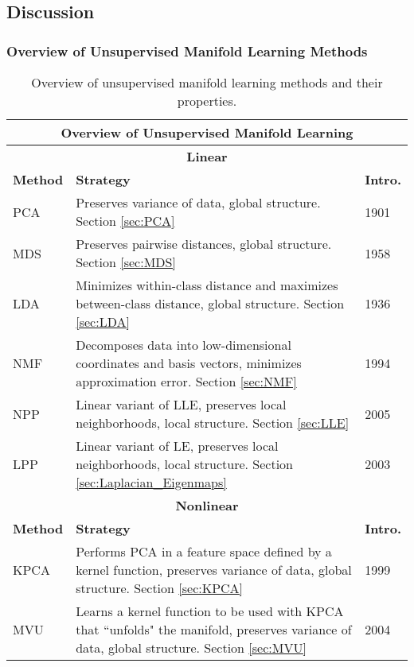 \subsection{Discussion}

\subsubsection{Overview of Unsupervised Manifold Learning Methods}

\begin{longtable}{ |p{}|p{}|p{}| } 
	\caption{Overview of unsupervised manifold learning methods and their properties.}
	\label{tab:Manifold_Learning_Comparison_Table}\\
	\hline
	\multicolumn{3}{|c|}{\textbf{Overview of Unsupervised Manifold Learning}} \\
	\hline
	\multicolumn{3}{|c|}{\textbf{Linear}} \\
	\hline
	\textbf{Method} & \textbf{Strategy} & \textbf{Intro.}\\
	\hline
	PCA   & Preserves variance of data, global structure. Section \ref{sec:PCA} & 1901\\
	\hline
	MDS  & Preserves pairwise distances, global structure. Section \ref{sec:MDS}  & 1958\\
	\hline
	LDA  & Minimizes within-class distance and maximizes between-class distance, global structure. Section \ref{sec:LDA}  & 1936\\
	\hline
	NMF   & Decomposes data into low-dimensional coordinates and basis vectors, minimizes approximation error. Section \ref{sec:NMF} & 1994\\
	\hline
	NPP  & Linear variant of LLE, preserves local neighborhoods, local structure. Section \ref{sec:LLE}  & 2005\\
	\hline
	LPP  & Linear variant of LE, preserves local neighborhoods, local structure. Section \ref{sec:Laplacian_Eigenmaps}  & 2003\\
	\hline
	\multicolumn{3}{|c|}{\textbf{Nonlinear}} \\
	\hline
	\textbf{Method} & \textbf{Strategy} & \textbf{Intro.}\\
	\hline
	KPCA  & Performs PCA in a feature space defined by a kernel function, preserves variance of data, global structure.  Section \ref{sec:KPCA}  & 1999 \\
	\hline
	MVU  & Learns a kernel function to be used with KPCA that ``unfolds" the manifold, preserves variance of data, global structure. Section \ref{sec:MVU}  & 2004\\

\end{longtable}
